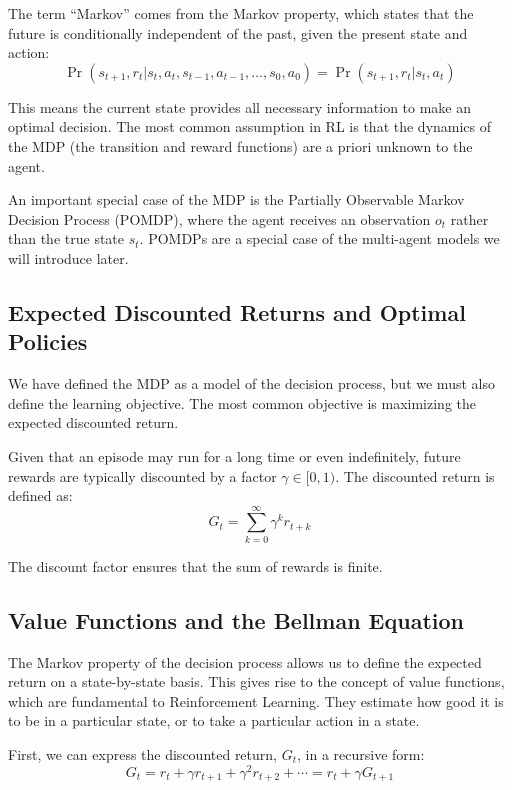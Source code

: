 The term “Markov” comes from the Markov property, which states that the future is conditionally independent of the past, given the present state and action:
$$
\Pr(s_{t+1}, r_t | s_t, a_t, s_{t-1}, a_{t-1}, \dots, s_0, a_0) = \Pr(s_{t+1}, r_t | s_t, a_t)
$$

This means the current state provides all necessary information to make an optimal decision. The most common assumption in RL is that the dynamics of the MDP (the transition and reward functions) are a priori unknown to the agent.

An important special case of the MDP is the Partially Observable Markov Decision Process (POMDP), where the agent receives an observation $o_t$ rather than the true state $s_t$. POMDPs are a special case of the multi-agent models we will introduce later.

\subsection*{Expected Discounted Returns and Optimal Policies}
We have defined the MDP as a model of the decision process, but we must also define the learning objective. The most common objective is maximizing the expected discounted return.

Given that an episode may run for a long time or even indefinitely, future rewards are typically discounted by a factor $\gamma \in [0, 1)$. The discounted return is defined as:
\begin{equation}
G_t = \sum_{k=0}^{\infty} \gamma^k r_{t+k}
\end{equation}

The discount factor ensures that the sum of rewards is finite.

\subsection*{Value Functions and the Bellman Equation}
The Markov property of the decision process allows us to define the expected return on a state-by-state basis. This gives rise to the concept of value functions, which are fundamental to Reinforcement Learning. They estimate how good it is to be in a particular state, or to take a particular action in a state.

First, we can express the discounted return, $G_t$, in a recursive form:
\begin{equation}
    G_t = r_t + \gamma r_{t+1} + \gamma^2 r_{t+2} + \cdots = r_t + \gamma G_{t+1}
\end{equation}

